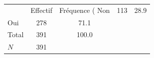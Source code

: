 {
\def\sym#1{\ifmmode^{#1}\else\(^{#1}\)\fi}
\begin{tabular}{l*{1}{cc}}
\toprule
            &    Effectif&Fréquence (%
\midrule
Non         &         113&        28.9\\
Oui         &         278&        71.1\\
Total       &         391&       100.0\\
\midrule
\(N\)       &         391&            \\
\bottomrule
\end{tabular}
}
